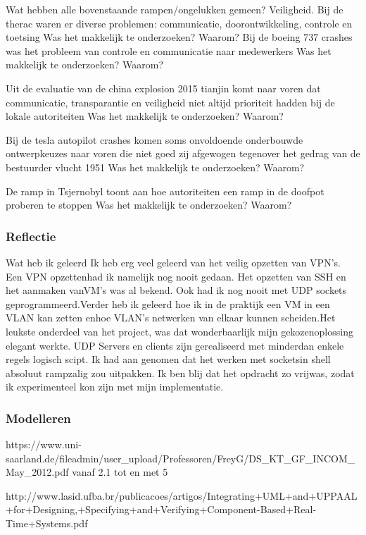 Wat hebben alle bovenstaande rampen/ongelukken gemeen? Veiligheid.
Bij de therac waren er diverse problemen: communicatie, doorontwikkeling, controle en toetsing
Was het makkelijk te onderzoeken? Waarom?
Bij de boeing 737 crashes was het probleem van controle en communicatie naar medewerkers
Was het makkelijk te onderzoeken? Waarom?

Uit de evaluatie van de china explosion 2015 tianjin komt naar voren dat communicatie, transparantie en veiligheid niet altijd prioriteit hadden bij de lokale autoriteiten
Was het makkelijk te onderzoeken? Waarom?

Bij de tesla autopilot crashes komen soms onvoldoende onderbouwde ontwerpkeuzes naar voren die niet goed zij  afgewogen tegenover het gedrag van de bestuurder
vlucht 1951
Was het makkelijk te onderzoeken? Waarom?

De ramp in Tsjernobyl toont aan hoe autoriteiten een ramp in de doofpot proberen te stoppen
Was het makkelijk te onderzoeken? Waarom?


\subsubsection{Reflectie}
Wat heb ik geleerd
Ik heb erg veel geleerd van het veilig opzetten van VPN’s. Een VPN opzettenhad ik namelijk nog nooit gedaan. Het opzetten van SSH en het aanmaken vanVM’s was al bekend. Ook had ik nog nooit met UDP sockets geprogrammeerd.Verder heb ik geleerd hoe ik in de praktijk een VM in een VLAN kan zetten enhoe VLAN’s netwerken van elkaar kunnen scheiden.Het leukste onderdeel van het project, was dat wonderbaarlijk mijn gekozenoplossing elegant werkte. UDP Servers en clients zijn gerealiseerd met minderdan enkele regels logisch scipt. Ik had aan genomen dat het werken met socketsin shell absoluut rampzalig zou uitpakken. Ik ben blij dat het opdracht zo vrijwas, zodat ik experimenteel kon zijn met mijn implementatie.


\subsubsection{Modelleren}

https://www.uni-saarland.de/fileadmin/user_upload/Professoren/FreyG/DS_KT_GF_INCOM_May_2012.pdf
vanaf 2.1 tot en met 5

http://www.lasid.ufba.br/publicacoes/artigos/Integrating+UML+and+UPPAAL+for+Designing,+Specifying+and+Verifying+Component-Based+Real-Time+Systems.pdf

